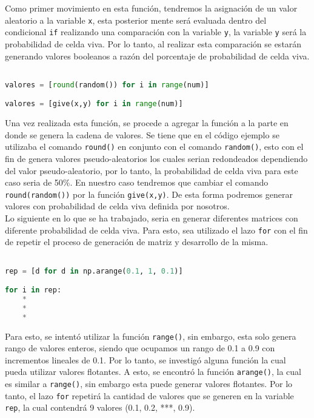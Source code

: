 \documentclass{article}
\begin{document}
Como primer movimiento en esta función, tendremos la asignación de un valor aleatorio a la variable \texttt{x}, esta posterior mente será evaluada dentro del condicional \texttt{if} realizando una comparación con la variable \texttt{y}, la variable \texttt{y} será la probabilidad de celda viva. Por lo tanto, al realizar esta comparación se estarán generando valores booleanos a razón del porcentaje de probabilidad de celda viva.\\

\begin{lstlisting}[language=Python]

valores = [round(random()) for i in range(num)]

valores = [give(x,y) for i in range(num)]

\end{lstlisting}

Una vez realizada esta función, se procede a agregar la función a la parte en donde se genera la cadena de valores. Se tiene que en el código ejemplo\citep{Ejem} se utilizaba el comando \texttt{round()} en conjunto con el comando \texttt{random()}, esto con el fin de genera valores pseudo-aleatorios los cuales serian redondeados dependiendo del valor pseudo-aleatorio, por lo tanto, la probabilidad de celda viva para este caso seria de 50\%. En nuestro caso tendremos que cambiar el comando \texttt{round(random())} por la función \texttt{give(x,y)}. De esta forma podremos generar valores con probabilidad de celda viva definida por nosotros.\\

Lo siguiente en lo que se ha trabajado, seria en generar diferentes matrices  con diferente probabilidad de celda viva. Para esto, sea utilizado el lazo \texttt{for} con el fin de repetir el proceso de generación de matriz y desarrollo de la misma. \\

\begin{lstlisting}[language=Python]

rep = [d for d in np.arange(0.1, 1, 0.1)]

for i in rep:
	*
	*
	*
\end{lstlisting}  

Para esto, se intentó utilizar la función \texttt{range()}, sin embargo, esta solo genera rango de valores enteros, siendo que ocupamos un rango de 0.1 a 0.9 con incrementos lineales de 0.1. Por lo tanto, se investigó alguna función la cual pueda utilizar valores flotantes. A esto, se encontró la función \texttt{arange()}\citep{Grange}, la cual es similar a \texttt{range()}, sin embargo esta puede generar valores flotantes. Por lo tanto, el lazo \texttt{for} repetirá la cantidad de valores que se generen en la variable \texttt{rep}, la cual contendrá 9 valores (0.1, 0.2, ***, 0.9).\\
\end{document}
